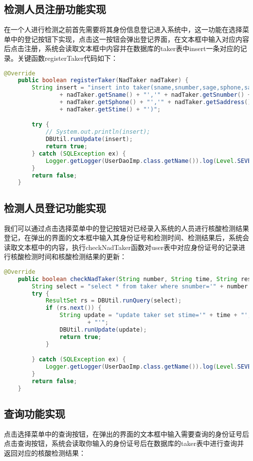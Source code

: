 \documentclass{article}
\begin{document}
\subsection{检测人员注册功能实现}
在一个人进行检测之前首先需要将其身份信息登记进入系统中，这一功能在选择菜单中的登记按钮下实现，点击这一按钮会弹出登记界面，在文本框中输入对应内容后点击注册，系统会读取文本框中内容并在数据库的taker表中insert一条对应的记录。关键函数registerTaker代码如下：

\begin{lstlisting}[language = java]
   @Override
	public boolean registerTaker(NadTaker nadTaker) {
		String insert = "insert into taker(sname,snumber,sage,sphone,saddress,state,stime) " + "values('"
				+ nadTaker.getSname() + "','" + nadTaker.getSnumber() + "','" + nadTaker.getSage() + "','"
				+ nadTaker.getSphone() + "','" + nadTaker.getSaddress() + "','" + nadTaker.getState() + "','"
				+ nadTaker.getStime() + "')";

		try {
			// System.out.println(insert);
			DBUtil.runUpdate(insert);
			return true;
		} catch (SQLException ex) {
			Logger.getLogger(UserDaoImp.class.getName()).log(Level.SEVERE, null, ex);
		}
		return false;
	}
\end{lstlisting}

\subsection{检测人员登记功能实现}
我们可以通过点击选择菜单中的登记按钮对已经录入系统的人员进行核酸检测结果登记，在弹出的界面的文本框中输入其身份证号和检测时间、检测结果后，系统会读取文本框中的内容，执行checkNadTaker函数对user表中对应身份证号的记录进行核酸检测时间和核酸检测结果的更新：

\begin{lstlisting}[language = java]
   @Override
	public boolean checkNadTaker(String number, String time, String res) {
		String select = "select * from taker where snumber='" + number + "'";
		try {
			ResultSet rs = DBUtil.runQuery(select);
			if (rs.next()) {
				String update = "update taker set stime='" + time + "', state='" + res + "' where snumber='" + number
						+ "'";
				DBUtil.runUpdate(update);
				return true;
			}

		} catch (SQLException ex) {
			Logger.getLogger(UserDaoImp.class.getName()).log(Level.SEVERE, null, ex);
		}
		return false;
	}
\end{lstlisting}

\subsection{查询功能实现}
点击选择菜单中的查询按钮，在弹出的界面的文本框中输入需要查询的身份证号后点击查询按钮，系统会读取你输入的身份证号后在数据库的taker表中进行查询并返回对应的核酸检测结果：
\end{document}
